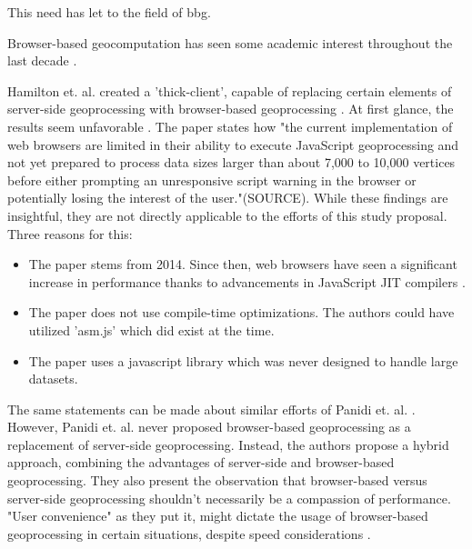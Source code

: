 This need has let to the field of \ac{bbg}.


Browser-based geocomputation has seen some academic interest throughout the last decade \cite{hamilton_client-side_2014, panidi_hybrid_2015, kulawiak_analysis_2019}.

Hamilton et. al. created a 'thick-client', capable of replacing certain elements of server-side geoprocessing with browser-based geoprocessing \cite{hamilton_client-side_2014}. 
At first glance, the results seem unfavorable . 
The paper states how "the current implementation of web browsers are limited in their ability to execute JavaScript geoprocessing and not yet prepared to process data sizes larger than about 7,000 to 10,000 vertices before either prompting an unresponsive script warning in the browser or potentially losing the interest of the user."(SOURCE). 
While these findings are insightful, they are not directly applicable to the efforts of this study proposal. Three reasons for this:

\begin{itemize}
  \item The paper stems from 2014. Since then, web browsers have seen a significant increase in performance thanks to advancements in JavaScript JIT compilers \cite{haas_bringing_2017, kulawiak_analysis_2019}. 
  \item The paper does not use compile-time optimizations. The authors could have utilized 'asm.js' \cite{mozilla_asmjs_2013} which did exist at the time. 
  \item The paper uses a javascript library which was never designed to handle large datasets.
\end{itemize}

The same statements can be made about similar efforts of Panidi et. al. \cite{panidi_hybrid_2015}. 
However, Panidi et. al. never proposed browser-based geoprocessing as a replacement of server-side geoprocessing. 
Instead, the authors propose a hybrid approach, combining the advantages of server-side and browser-based geoprocessing. 
They also present the observation that browser-based versus server-side geoprocessing shouldn't necessarily be a compassion of performance. 
"User convenience" as they put it, might dictate the usage of browser-based geoprocessing in certain situations, despite speed considerations \cite{panidi_hybrid_2015}. 

